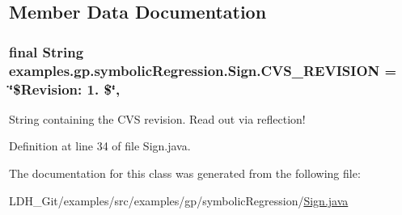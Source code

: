 \subsection{Member Data Documentation}
\hypertarget{classexamples_1_1gp_1_1symbolic_regression_1_1_sign_a48b58b94427db5f753feacb7bf870327}{
\subsubsection[{C\-V\-S\-\_\-\-R\-E\-V\-I\-S\-I\-O\-N}]{\setlength{\rightskip}{0pt plus 5cm}final String examples.\-gp.\-symbolic\-Regression.\-Sign.\-C\-V\-S\-\_\-\-R\-E\-V\-I\-S\-I\-O\-N = \char`\"{}\$Revision\-: 1. \$\char`\"{}\hspace{0.3cm}{\ttfamily [static]}, {\ttfamily [private]}}}\label{classexamples_1_1gp_1_1symbolic_regression_1_1_sign_a48b58b94427db5f753feacb7bf870327}
String containing the C\-V\-S revision. Read out via reflection! 

Definition at line 34 of file Sign.\-java.



The documentation for this class was generated from the following file\-:\begin{DoxyCompactItemize}
\item 
L\-D\-H\-\_\-\-Git/examples/src/examples/gp/symbolic\-Regression/\hyperlink{_sign_8java}{Sign.\-java}\end{DoxyCompactItemize}
